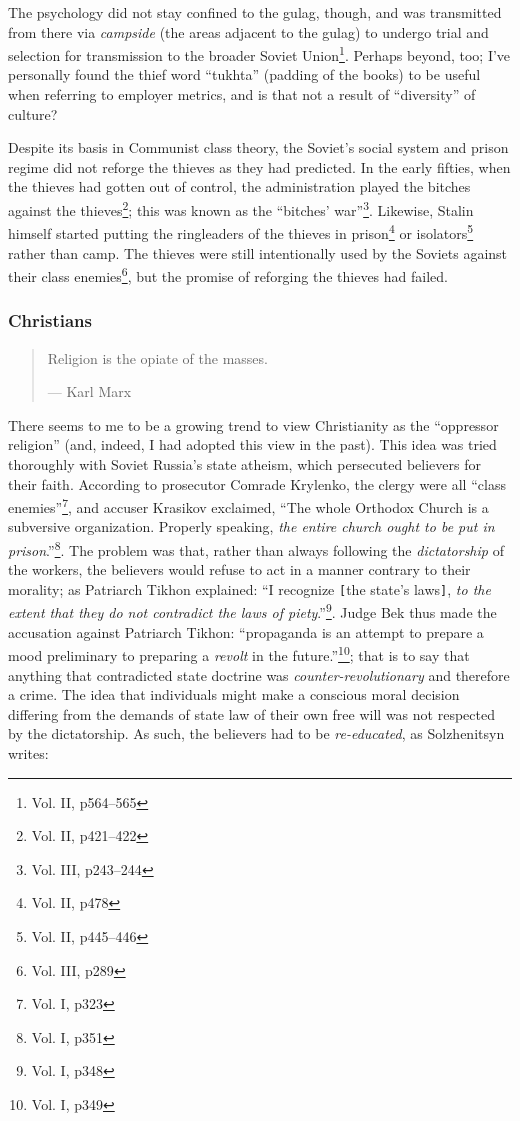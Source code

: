 \documentclass{article}
\begin{document}
The psychology did not stay confined to the gulag, though, and was transmitted from there via \emph{campside} (the areas adjacent to the gulag) to undergo trial and selection for transmission to the broader Soviet Union\footnote{Vol. II, p564--565}.  Perhaps beyond, too; I've personally found the thief word ``tukhta'' (padding of the books) to be useful when referring to employer metrics, and is that not a result of ``diversity'' of culture?

Despite its basis in Communist class theory, the Soviet's social system and prison regime did not reforge the thieves as they had predicted.  In the early fifties, when the thieves had gotten out of control, the administration played the bitches against the thieves\footnote{Vol. II, p421--422}; this was known as the ``bitches' war''\footnote{Vol. III, p243--244}.  Likewise, Stalin himself started putting the ringleaders of the thieves in prison\footnote{Vol. II, p478} or isolators\footnote{Vol. II, p445--446} rather than camp.  The thieves were still intentionally used by the Soviets against their class enemies\footnote{Vol. III, p289}, but the promise of reforging the thieves had failed.

\subsubsection{Christians}
\begin{quote}
Religion is the opiate of the masses.

--- Karl Marx
\end{quote}

There seems to me to be a growing trend to view Christianity as the ``oppressor religion'' (and, indeed, I had adopted this view in the past).  This idea was tried thoroughly with Soviet Russia's state atheism, which persecuted believers for their faith.  According to prosecutor Comrade Krylenko, the clergy were all ``class enemies''\footnote{Vol. I, p323}, and accuser Krasikov exclaimed, ``The whole Orthodox Church is a subversive organization.  Properly speaking, \emph{the entire church ought to be put in prison}.''\footnote{Vol. I, p351}.  The problem was that, rather than always following the \emph{dictatorship} of the workers, the believers would refuse to act in a manner contrary to their morality; as Patriarch Tikhon explained: ``I recognize \verb|[|the state's laws\verb|]|, \emph{to the extent that they do not contradict the laws of piety}.''\footnote{Vol. I, p348}.  Judge Bek thus made the accusation against Patriarch Tikhon: ``propaganda is an attempt to prepare a mood preliminary to preparing a \emph{revolt} in the future.''\footnote{Vol. I, p349}; that is to say that anything that contradicted state doctrine was \emph{counter-revolutionary} and therefore a crime.  The idea that individuals might make a conscious moral decision differing from the demands of state law of their own free will was not respected by the dictatorship.  As such, the believers had to be \emph{re-educated}, as Solzhenitsyn writes:
\end{document}
